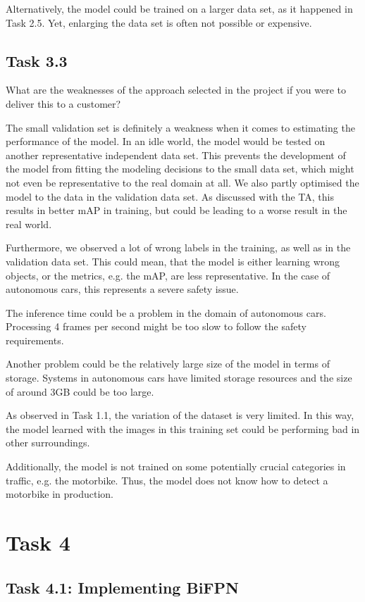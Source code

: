 \documentclass{article}
\begin{document}
Alternatively, the model could be trained on a larger data set, as it happened in Task 2.5. Yet, enlarging the data set is often not possible or expensive.


\subsection*{Task 3.3}
What are the weaknesses of the approach selected in the project if you were to deliver this to a customer?

The small validation set is definitely a weakness when it comes to estimating the performance of the model. In an idle world, the model would be tested on another representative independent data set. This prevents the development of the model from fitting the modeling decisions to the small data set, which might not even be representative to the real domain at all. We also partly optimised the model to the data in the validation data set. As discussed with the TA, this results in better mAP in training, but could be leading to a worse result in the real world.

Furthermore, we observed a lot of wrong labels in the training, as well as in the validation data set. This could mean, that the model is either learning wrong objects, or the metrics, e.g. the mAP, are less representative. In the case of autonomous cars, this represents a severe safety issue.

The inference time could be a problem in the domain of autonomous cars. Processing 4 frames per second might be too slow to follow the safety requirements.

Another problem could be the relatively large size of the model in terms of storage. Systems in autonomous cars have limited storage resources and the size of around 3GB could be too large.

As observed in Task 1.1, the variation of the dataset is very limited. In this way, the model learned with the images in this training set could be performing bad in other surroundings.

Additionally, the model is not trained on some potentially crucial categories in traffic, e.g. the motorbike. Thus, the model does not know how to detect a motorbike in production.


\section*{Task 4}

\subsection*{Task 4.1: Implementing BiFPN}
\end{document}
